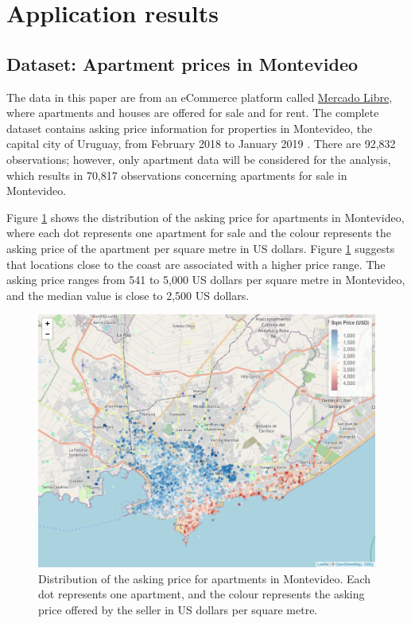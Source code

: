 \documentclass[smallextended,natbib]{svjour3}\usepackage[]{graphicx}\usepackage[]{xcolor}
\begin{document}
\section{Application results}
\label{section:appl}

\subsection{Dataset: Apartment prices in Montevideo}
The data in this paper are from an eCommerce platform called \href{https://www.mercadolibre.com.uy)}{Mercado Libre}, where apartments and houses are offered for sale and for rent. The complete dataset contains asking price information for properties in Montevideo, the capital city of Uruguay, from February 2018 to January 2019 \citep{Picardo}. There are 92,832 observations; however, only apartment data will be considered for the analysis, which results in 70,817 observations concerning apartments for sale in Montevideo.

 Figure \ref{mapa} shows the distribution of the asking price for apartments in Montevideo, where each dot represents one apartment for sale and the colour represents the asking price of the apartment per square metre in US dollars. Figure \ref{mapa} suggests that locations close to the coast are associated with a higher price range. The asking price ranges from 541 to 5,000 US dollars per square metre in Montevideo, and the median value is close to 2,500 US dollars.  
 \begin{figure}[hbpt]
\centering
\includegraphics[width=1\linewidth]{figures/mapa_preciom2.png}
\caption{Distribution of the asking price for apartments in Montevideo. Each dot represents one apartment, and the colour represents the asking price offered by the seller in US dollars per square metre. 
\label{mapa} }
\end{figure}
\end{document}
